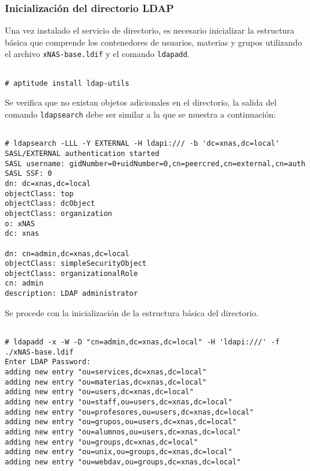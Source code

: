           \subsubsection {Inicializaci\'{o}n del directorio \textsc{LDAP}}

Una vez instalado el servicio de directorio, es necesario inicializar la estructura b\'{a}sica que comprende los contenedores de usuarios, materias y grupos utilizando el archivo \texttt{xNAS-base.ldif} y el comando \texttt{ldapadd}.


{
\scriptsize
\linespread{1}
\begin{verbatim}

# aptitude install ldap-utils
 \end{verbatim}
}

Se verifica que no existan objetos adicionales en el directorio, la salida del comando \texttt{ldapsearch} debe ser similar a la que se muestra a continuaci\'{o}n:

{
\scriptsize
\linespread{1}
\begin{verbatim}

# ldapsearch -LLL -Y EXTERNAL -H ldapi:/// -b 'dc=xnas,dc=local'
SASL/EXTERNAL authentication started
SASL username: gidNumber=0+uidNumber=0,cn=peercred,cn=external,cn=auth
SASL SSF: 0
dn: dc=xnas,dc=local
objectClass: top
objectClass: dcObject
objectClass: organization
o: xNAS
dc: xnas

dn: cn=admin,dc=xnas,dc=local
objectClass: simpleSecurityObject
objectClass: organizationalRole
cn: admin
description: LDAP administrator
 \end{verbatim}
}

Se procede con la inicializaci\'{o}n de la estructura b\'{a}sica del directorio.

{
\scriptsize
\linespread{1}
\begin{verbatim}

# ldapadd -x -W -D "cn=admin,dc=xnas,dc=local" -H 'ldapi:///' -f ./xNAS-base.ldif
Enter LDAP Password: 
adding new entry "ou=services,dc=xnas,dc=local"
adding new entry "ou=materias,dc=xnas,dc=local"
adding new entry "ou=users,dc=xnas,dc=local"
adding new entry "ou=staff,ou=users,dc=xnas,dc=local"
adding new entry "ou=profesores,ou=users,dc=xnas,dc=local"
adding new entry "ou=grupos,ou=users,dc=xnas,dc=local"
adding new entry "ou=alumnos,ou=users,dc=xnas,dc=local"
adding new entry "ou=groups,dc=xnas,dc=local"
adding new entry "ou=unix,ou=groups,dc=xnas,dc=local"
adding new entry "ou=webdav,ou=groups,dc=xnas,dc=local"
\end{verbatim}
}


